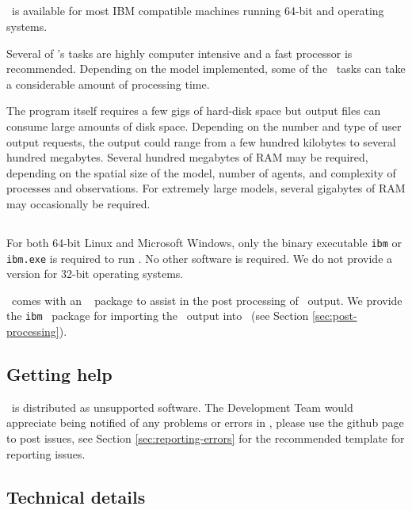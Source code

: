 \subsection{}
\IBM\ is available for most IBM compatible machines running 64-bit  and  operating systems.

Several of \IBM 's tasks are highly computer intensive and a fast processor is recommended. Depending on the model implemented, some of the \IBM\ tasks can take a considerable amount of processing time.

The program itself requires a few gigs of hard-disk space but output files can consume large amounts of disk space. Depending on the number and type of user output requests, the output could range from a few hundred kilobytes to several hundred megabytes. Several hundred megabytes of RAM may be required, depending on the spatial size of the model, number of agents, and complexity of processes and observations. For extremely large models, several gigabytes of RAM may occasionally be required. 

\subsection{}

For both 64-bit Linux and Microsoft Windows, only the binary executable \texttt{ibm} or \texttt{ibm.exe} is required to run \IBM . No other software is required. We do not provide a version for 32-bit operating systems. 

\IBM\ comes with an \href{http://www.r-project.org}{\R}\ \citep{R} package to assist in the post processing of \IBM\ output. We provide the \texttt{ibm} \R\ package for importing the \IBM\ output into \R\ (see Section \ref{sec:post-processing}).

\subsection{Getting help}

\IBM\ is distributed as unsupported software. The Development Team would appreciate being notified of any problems or errors in \IBM , please use the github page to post issues, see Section \ref{sec:reporting-errors} for the recommended template for reporting issues.

\subsection{Technical details}\label{sec:tech}

